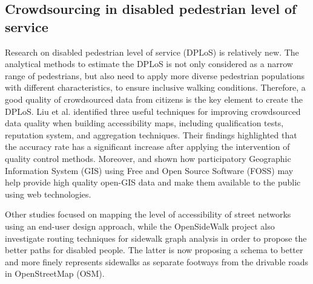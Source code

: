 \documentclass[10pt,conference,a4paper]{IEEEtran}
\begin{document}


\subsection{Crowdsourcing in disabled pedestrian level of service}
Research on disabled pedestrian level of service (DPLoS) is relatively new. The analytical methods to estimate the DPLoS is not only considered as a narrow range of pedestrians, but also need to apply more diverse pedestrian populations with different characteristics, to ensure inclusive walking conditions. Therefore, a good quality of crowdsourced data from citizens is the key element to create the DPLoS. Liu et al. \cite{liu2018} identified three useful techniques for improving crowdsourced data quality when building accessibility maps, including qualification tests, reputation system, and aggregation techniques. Their findings highlighted that the accuracy rate has a significant increase after applying the intervention of quality control methods. Moreover, \cite{brovelli_webbased_2014} and \cite{minghini_multi-dimensional_2014} shown how participatory Geographic Information System (GIS) using Free and Open Source Software (FOSS) may help provide high quality open-GIS data and make them available to the public using web technologies. 

Other studies \cite{comai_mapping_2015, gharebaghi2017confidence} focused on mapping the level of accessibility of street networks %
using an end-user design approach, while
the OpenSideWalk project also
\cite{noauthor_opensidewalks_nodate} 
investigate routing techniques for sidewalk graph analysis in order to propose the better paths for disabled people. The latter is now proposing a schema to better and more finely represents sidewalks as separate footways from the drivable roads in OpenStreetMap (OSM).%
\end{document}
